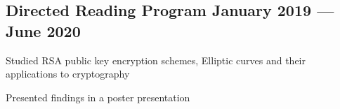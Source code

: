 \documentclass[a4paper,12pt]{article}
\begin{document}

\subsection{{Directed Reading Program  January 2019 --- June 2020}}
\begin{zitemize}
    \item Studied RSA public key encryption schemes, Elliptic curves and their applications to cryptography
    \item Presented findings in a poster presentation
\end{zitemize}
\end{document}
